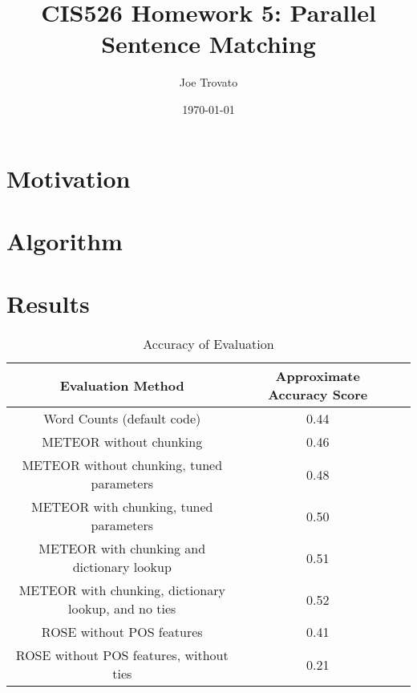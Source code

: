 \documentclass{article}
\begin{document}
\title{CIS526 Homework 5: Parallel Sentence Matching}
\author{Joe Trovato}
\date{\today}
\maketitle
\setlength{\parindent}{10ex}

\section{Motivation}
\par

\section{Algorithm}

\section{Results}
\par



\begin{table}[!h]
\caption{Accuracy of Evaluation}
\begin{center}

\begin{tabular}{|c|c|c|}
	\hline
	Evaluation Method & Approximate Accuracy Score \\
	\hline
	Word Counts (default code) & 0.44 \\
	\hline
	METEOR without chunking & 0.46 \\
	\hline
	METEOR without chunking, tuned parameters & 0.48 \\
	\hline
	METEOR with chunking, tuned parameters & 0.50 \\
	\hline
	METEOR with chunking and dictionary lookup & 0.51\\
	\hline
	METEOR with chunking, dictionary lookup, and no ties & 0.52\\
	\hline
	ROSE without POS features & 0.41 \\
	\hline
	ROSE without POS features, without ties & 0.21 \\
	\hline
\end{tabular}
\end{center}

\end{table}
	
\end{document}
